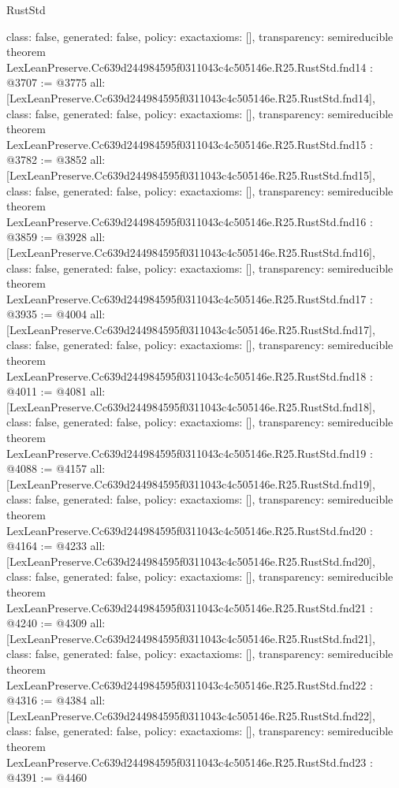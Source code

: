 \begin{lexlean}{RustStd}
\begin{coremodule}
{  class: false,
  generated: false,
  policy: exact{axioms: []},
  transparency: semireducible
}
theorem LexLeanPreserve.Cc639d244984595f0311043c4c505146e.R25.RustStd.fnd14 : @3707 := @3775 {
  all: [LexLeanPreserve.Cc639d244984595f0311043c4c505146e.R25.RustStd.fnd14],
  class: false,
  generated: false,
  policy: exact{axioms: []},
  transparency: semireducible
}
theorem LexLeanPreserve.Cc639d244984595f0311043c4c505146e.R25.RustStd.fnd15 : @3782 := @3852 {
  all: [LexLeanPreserve.Cc639d244984595f0311043c4c505146e.R25.RustStd.fnd15],
  class: false,
  generated: false,
  policy: exact{axioms: []},
  transparency: semireducible
}
theorem LexLeanPreserve.Cc639d244984595f0311043c4c505146e.R25.RustStd.fnd16 : @3859 := @3928 {
  all: [LexLeanPreserve.Cc639d244984595f0311043c4c505146e.R25.RustStd.fnd16],
  class: false,
  generated: false,
  policy: exact{axioms: []},
  transparency: semireducible
}
theorem LexLeanPreserve.Cc639d244984595f0311043c4c505146e.R25.RustStd.fnd17 : @3935 := @4004 {
  all: [LexLeanPreserve.Cc639d244984595f0311043c4c505146e.R25.RustStd.fnd17],
  class: false,
  generated: false,
  policy: exact{axioms: []},
  transparency: semireducible
}
theorem LexLeanPreserve.Cc639d244984595f0311043c4c505146e.R25.RustStd.fnd18 : @4011 := @4081 {
  all: [LexLeanPreserve.Cc639d244984595f0311043c4c505146e.R25.RustStd.fnd18],
  class: false,
  generated: false,
  policy: exact{axioms: []},
  transparency: semireducible
}
theorem LexLeanPreserve.Cc639d244984595f0311043c4c505146e.R25.RustStd.fnd19 : @4088 := @4157 {
  all: [LexLeanPreserve.Cc639d244984595f0311043c4c505146e.R25.RustStd.fnd19],
  class: false,
  generated: false,
  policy: exact{axioms: []},
  transparency: semireducible
}
theorem LexLeanPreserve.Cc639d244984595f0311043c4c505146e.R25.RustStd.fnd20 : @4164 := @4233 {
  all: [LexLeanPreserve.Cc639d244984595f0311043c4c505146e.R25.RustStd.fnd20],
  class: false,
  generated: false,
  policy: exact{axioms: []},
  transparency: semireducible
}
theorem LexLeanPreserve.Cc639d244984595f0311043c4c505146e.R25.RustStd.fnd21 : @4240 := @4309 {
  all: [LexLeanPreserve.Cc639d244984595f0311043c4c505146e.R25.RustStd.fnd21],
  class: false,
  generated: false,
  policy: exact{axioms: []},
  transparency: semireducible
}
theorem LexLeanPreserve.Cc639d244984595f0311043c4c505146e.R25.RustStd.fnd22 : @4316 := @4384 {
  all: [LexLeanPreserve.Cc639d244984595f0311043c4c505146e.R25.RustStd.fnd22],
  class: false,
  generated: false,
  policy: exact{axioms: []},
  transparency: semireducible
}
theorem LexLeanPreserve.Cc639d244984595f0311043c4c505146e.R25.RustStd.fnd23 : @4391 := @4460 {
}
\end{coremodule}
\end{lexlean}
